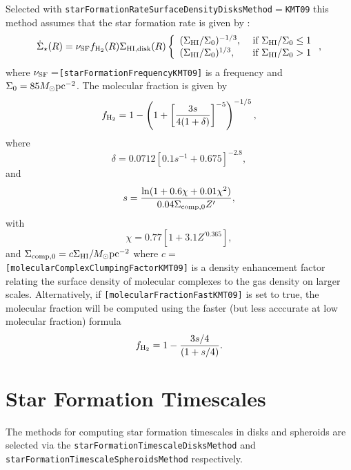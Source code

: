 Selected with {\tt starFormationRateSurfaceDensityDisksMethod}$=${\tt KMT09} this method assumes that the star formation rate is given by \citep{krumholz_star_2009}:
\begin{equation}
 \dot{\Sigma}_\star(R) = \nu_{\rm SF} f_{\rm H_2}(R)\Sigma_{\rm HI, disk}(R) \left\{ \begin{array}{ll} (\Sigma_{\rm HI}/\Sigma_0)^{-1/3}, &  \hbox{ if } \Sigma_{\rm HI}/\Sigma_0 \le 1 \\ (\Sigma_{\rm HI}/\Sigma_0)^{1/3}, & \hbox{ if } \Sigma_{\rm HI}/\Sigma_0 > 1 \end{array} \right. ,
\end{equation}
where $\nu_{\rm SF}=${\tt [starFormationFrequencyKMT09]} is a frequency and $\Sigma_0=85 M_\odot \hbox{pc}^{-2}$. The molecular fraction is given by
\begin{equation}
 f_{\rm H_2} = 1 - \left( 1 + \left[ { 3 s \over 4 (1+\delta)} \right]^{-5} \right)^{-1/5},
\end{equation}
where
\begin{equation}
 \delta = 0.0712 \left[ 0.1 s^{-1} + 0.675 \right]^{-2.8},
\end{equation}
and
\begin{equation}
 s = {\ln(1+0.6\chi+0.01\chi^2) \over 0.04 \Sigma_{\rm comp,0} Z^\prime},
\end{equation}
with
\begin{equation}
 \chi = 0.77 \left[ 1 + 3.1 Z^{\prime 0.365} \right],
\end{equation}
and $\Sigma_{\rm comp,0}=c \Sigma_{\rm HI}/M_\odot \hbox{pc}^{-2}$ where $c=${\tt [molecularComplexClumpingFactorKMT09]} is a density enhancement factor relating the surface density of molecular complexes to the gas density on larger scales. Alternatively, if {\tt [molecularFractionFastKMT09]} is set to true, the molecular fraction will be computed using the faster (but less acccurate at low molecular fraction) formula
\begin{equation}
 f_{\rm H_2} = 1 - { 3s/4 \over (1 + s/4)}.
\end{equation}

\section{Star Formation Timescales}

The methods for computing star formation timescales in disks and spheroids are selected via the {\tt starFormationTimescaleDisksMethod} and {\tt starFormationTimescaleSpheroidsMethod} respectively.

